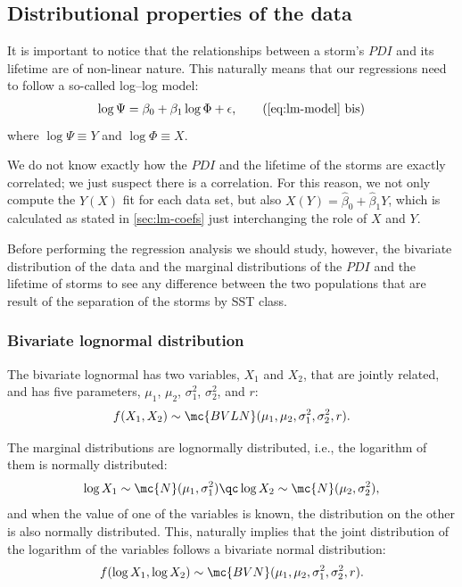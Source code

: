 \subsection{Distributional properties of the data}\label{sec:distribution-analysis}
It is important to notice that the relationships between a storm's $PDI$ and its lifetime are of non-linear nature. This naturally means that our regressions need to follow a so-called log--log model:
\begin{align}\label{eq:lm-model-bis}
	\log \Psi = \beta_{0} + \beta_{1} \log \Phi + \epsilon,
	\tag{\ref{eq:lm-model} bis}
\end{align}
where $\log \Psi \equiv Y$ and $\log \Phi \equiv X$.

We do not know exactly how the $PDI$ and the lifetime of the storms are exactly correlated; we just suspect there is a correlation. For this reason, we not only compute the $Y(X)$ fit for each data set, but also $X(Y) = \hat{\beta}_{0} + \hat{\beta}_{1} Y$, which is calculated as stated in \cref{sec:lm-coefs} just interchanging the role of $X$ and $Y$.

\medskip
Before performing the regression analysis we should study, however, the bivariate distribution of the data and the marginal distributions of the $PDI$ and the lifetime of storms to see any difference between the two populations that are result of the separation of the storms by SST class.

\subsubsection{Bivariate lognormal distribution}\label{sec:bvln-distribution}
\nocite{Thomopoulos2017}
The bivariate lognormal has two variables, $X_{1}$ and $X_{2}$, that are jointly related, and has five parameters, $\mu_{1}$, $\mu_{2}$, $\sigma_{1}^{2}$, $\sigma_{2}^{2}$, and $r$:
\begin{align}
	f(X_{1}, X_{2}) \sim \mc{BVLN}(\mu_{1}, \mu_{2}, \sigma_{1}^{2}, \sigma_{2}^{2}, r).
\end{align}

The marginal distributions are lognormally distributed, i.e., the logarithm of them is normally distributed:
\begin{align}
	\log X_{1} \sim \mc{N}(\mu_{1}, \sigma_{1}^{2})
	\qc
	\log X_{2} \sim \mc{N}(\mu_{2}, \sigma_{2}^{2})
	,
\end{align}
and when the value of one of the variables is known, the distribution on the other is also normally distributed. This, naturally implies that the joint distribution of the logarithm of the variables follows a bivariate normal distribution:
\begin{align}
	f(\log X_{1}, \log X_{2}) \sim \mc{BVN}(\mu_{1}, \mu_{2}, \sigma_{1}^{2}, \sigma_{2}^{2}, r) .
\end{align}

